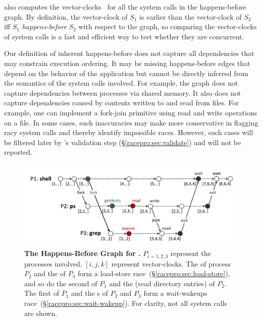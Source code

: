 \racepro also computes the vector-clocks~\cite{vectorclock} for all the
system calls in the happens-before graph.  By definition, the
vector-clock of $S_1$ is earlier than the vector-clock of $S_2$ iff
$S_1$ \emph{happens-before} $S_2$ with respect to the graph, so comparing
the vector-clocks of system calls is a fast and efficient way to test
whether they are concurrent.

Our definition of inherent happens-before does not capture all
dependencies that may constrain execution ordering. It may be missing
happens-before edges that depend on the behavior of the application
but cannot be directly inferred from the semantics of the system calls
involved. For example, the graph does not capture dependencies between
processes via shared memory. It also does not capture dependencies
caused by contents written to and read from files. For example, one
can implement a fork-join primitive using read and write operations on
a file.  In some cases, such inaccuracies may make \racepro more
conservative in flagging racy system calls and thereby identify
impossible races.  However, such cases will be filtered later by
\racepro's validation step (\S\ref{racepro:sec:validate}) and will not be reported.

\begin{figure}[]
\centering
\hspace*{-1.4em}
\includegraphics[width=1.05\linewidth]{figures/racepro/psgrep}
\caption{{\bf The Happens-Before Graph for .}
  $P_{i=1,2,3}$ represent the processes involved.
  $[i,j,k]$ represent vector-clocks.
  The  of process $P_2$ and the  of
  $P_3$ form a load-store race~(\S\ref{racepro:sec:load-store}), and so do the
  second  of $P_1$ and the  (read directory entries) of $P_2$. The first
   of $P_1$ and the s of $P_2$ and $P_3$ form a
  wait-wakeups race~(\S\ref{racepro:sec:wait-wakeup}). For clarity, not all
  system calls are shown.} \label{racepro:fig:psgrep}
\end{figure}


